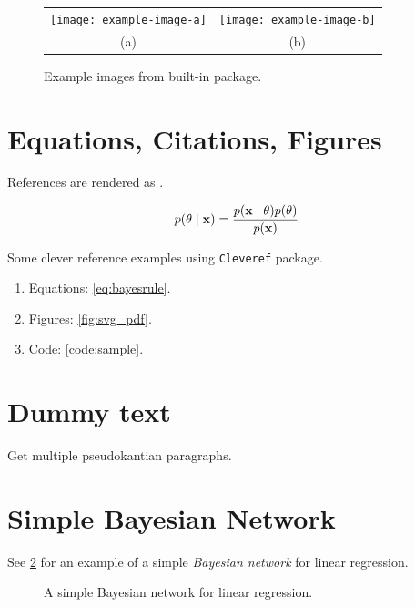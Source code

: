 \documentclass{article}
\begin{document}
\begin{figure}[!ht]
\centering
\begin{tabular}{cc}
    \texttt{[image: example-image-a]} & \texttt{[image: example-image-b]} \\
    (a) & (b)
\end{tabular}
\caption{Example images from built-in package.}
\label{fig:my_label}
\end{figure}

\section{Equations, Citations, Figures}

References are rendered as \citet{icml2021-vargp}.

\begin{align}
p(\theta \mid {\ensuremath{\boldsymbol{\mathbf{x}}}}) = \frac{p({\boldsymbol{\mathbf{x}}}\mid\theta)p(\theta)}{p({\boldsymbol{\mathbf{x}}})} \label{eq:bayesrule}
\end{align}

Some clever reference examples using \texttt{Cleveref} package.

\begin{enumerate}
\item Equations: \cref{eq:bayesrule}.
\item Figures: \cref{fig:svg_pdf}.
\item Code: \cref{code:sample}.
\end{enumerate}

\section{Dummy text}

Get multiple pseudokantian paragraphs.

\kant[1-3]

\section{Simple Bayesian Network}

See \cref{fig:bayes_net} for an example of a simple \emph{Bayesian network} for linear regression.

\begin{figure}[ht]
    \centering
{}
    \caption{A simple Bayesian network for linear regression.}
    \label{fig:bayes_net}
\end{figure}
\end{document}
